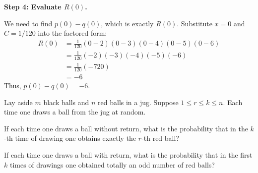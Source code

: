 \begin{solution}
\textbf{Step 4: Evaluate $R(0)$.}

We need to find $p(0) - q(0)$, which is exactly $R(0)$. Substitute $x=0$ and $C=1/120$ into the factored form:
\begin{align*}
R(0) &= \frac{1}{120} (0-2)(0-3)(0-4)(0-5)(0-6) \\
&= \frac{1}{120} (-2)(-3)(-4)(-5)(-6) \\
&= \frac{1}{120} (-720) \\
&= -6
\end{align*}
Thus, $p(0) - q(0) = -6$.
\end{solution}

\begin{exercise}\label{probability:2011:3}
Lay aside $m$ black balls and $n$ red balls in a jug. Suppose $1 \leq r \leq k \leq n$. Each time one draws a ball from the jug at random.

\item If each time one draws a ball without return, what is the probability that in the $k$-th time of drawing one obtains exactly the $r$-th red ball?
\item If each time one draws a ball with return, what is the probability that in the first $k$ times of drawings one obtained totally an odd number of red balls?
\end{exercise}

